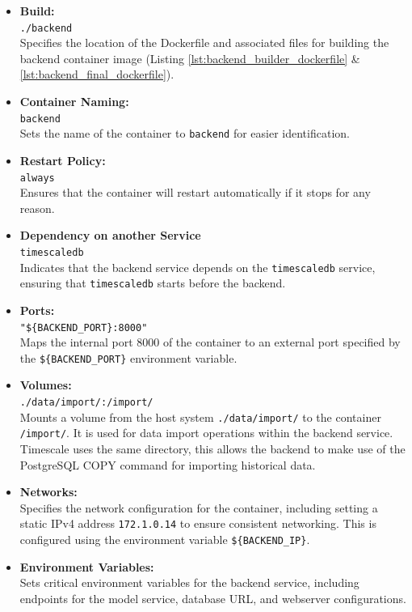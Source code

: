 \begin{itemize}
    \item \textbf{Build:} \\ \verb|./backend| \\ Specifies the location of the Dockerfile and associated files for building the backend container image (Listing \ref{lst:backend_builder_dockerfile} \& \ref{lst:backend_final_dockerfile}).
    \item \textbf{Container Naming:} \\ \verb|backend| \\ Sets the name of the container to \texttt{backend} for easier identification.
    \item \textbf{Restart Policy:} \\ \verb|always| \\ Ensures that the container will restart automatically if it stops for any reason.
    \item \textbf{Dependency on another Service} \\ \verb|timescaledb| \\ Indicates that the backend service depends on the \texttt{timescaledb} service, ensuring that \texttt{timescaledb} starts before the backend.
    \item \textbf{Ports:} \\ \verb|"${BACKEND_PORT}:8000"| \\ Maps the internal port 8000 of the container to an external port specified by the \texttt{\$\{BACKEND\_PORT\}} environment variable.
    \item \textbf{Volumes:} \\ \verb|./data/import/:/import/| \\ Mounts a volume from the host system \texttt{./data/import/} to the container \texttt{/import/}. It is used for data import operations within the backend service. Timescale uses the same directory, this allows the backend to make use of the PostgreSQL COPY command for importing historical data. 
    \item \textbf{Networks:} \\ Specifies the network configuration for the container, including setting a static IPv4 address \texttt{172.1.0.14} to ensure consistent networking. This is configured using the environment variable \texttt{\$\{BACKEND\_IP\}}.
    \item \textbf{Environment Variables:} \\ Sets critical environment variables for the backend service, including endpoints for the model service, database URL, and webserver configurations.
\end{itemize}

